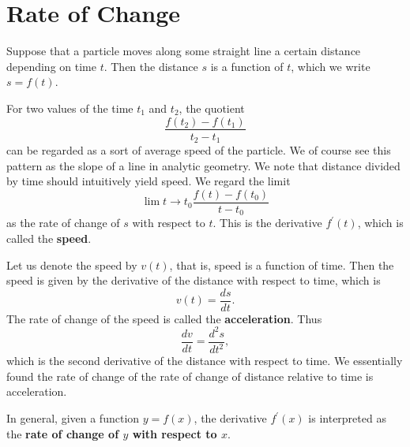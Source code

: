 \section*{Rate of Change}

Suppose that a particle moves along some straight line a certain distance depending on time $t$.
Then the distance $s$ is a function of $t$, which we write $s = f(t)$.

For two values of the time $t_1$ and $t_2$, the quotient
\[\frac{f(t_2) - f(t_1)}{t_2 - t_1}\]
can be regarded as a sort of average speed of the particle. We of course see this pattern as the slope of a line
in analytic geometry. We note that distance divided by time should intuitively yield speed. We regard the limit
\[\lim{t\to t_0} \frac{f(t) - f(t_0)}{t - t_0}\]
as the rate of change of $s$ with respect to $t$. This is the derivative $f^\prime(t)$, which is called the
\textbf{speed}.

Let us denote the speed by $v(t)$, that is, speed is a function of time. Then the speed is given by the derivative
of the distance with respect to time, which is
\[v(t) = \frac{ds}{dt}.\]
The rate of change of the speed is called the \textbf{acceleration}. Thus
\[\frac{dv}{dt} = \frac{d^2s}{dt^2},\]
which is the second derivative of the distance with respect to time. We essentially found the rate of change of the
rate of change of distance relative to time is acceleration.

In general, given a function $y = f(x)$, the derivative $f^\prime(x)$ is interpreted as the \textbf{rate of change
  of $y$ with respect to $x$}.
